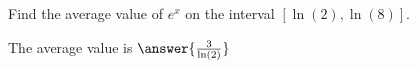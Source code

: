 \documentclass{ximera}
\author{Steven Gubkin}
\begin{document}
\begin{exercise}

Find the average value of $e^x$ on the interval $[\ln(2),\ln(8)]$.

\begin{prompt}
	The average value is $\answer{\frac{3}{\ln(2)}}$
\end{prompt}

\end{exercise}
\end{document}
